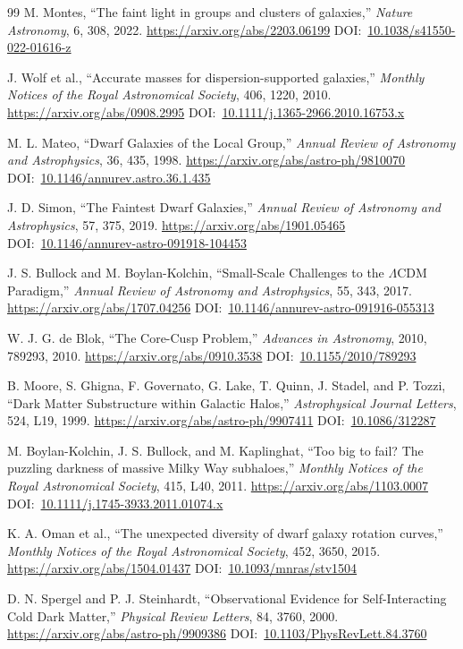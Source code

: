 \documentclass[10pt,onecolumn]{article}
\newcommand{\doi}[1]{DOI:~\href{https://doi.org/#1}{#1}}
\begin{document}
\begin{thebibliography}{99}
M. Montes,
``The faint light in groups and clusters of galaxies,''
\emph{Nature Astronomy}, 6, 308, 2022.
\url{https://arxiv.org/abs/2203.06199}
\doi{10.1038/s41550-022-01616-z}

J. Wolf et al.,
``Accurate masses for dispersion-supported galaxies,''
\emph{Monthly Notices of the Royal Astronomical Society}, 406, 1220, 2010.
\url{https://arxiv.org/abs/0908.2995}
\doi{10.1111/j.1365-2966.2010.16753.x}

M. L. Mateo,
``Dwarf Galaxies of the Local Group,''
\emph{Annual Review of Astronomy and Astrophysics}, 36, 435, 1998.
\url{https://arxiv.org/abs/astro-ph/9810070}
\doi{10.1146/annurev.astro.36.1.435}

J. D. Simon,
``The Faintest Dwarf Galaxies,''
\emph{Annual Review of Astronomy and Astrophysics}, 57, 375, 2019.
\url{https://arxiv.org/abs/1901.05465}
\doi{10.1146/annurev-astro-091918-104453}

J. S. Bullock and M. Boylan-Kolchin,
``Small-Scale Challenges to the $\Lambda$CDM Paradigm,''
\emph{Annual Review of Astronomy and Astrophysics}, 55, 343, 2017.
\url{https://arxiv.org/abs/1707.04256}
\doi{10.1146/annurev-astro-091916-055313}

W. J. G. de Blok,
``The Core-Cusp Problem,''
\emph{Advances in Astronomy}, 2010, 789293, 2010.
\url{https://arxiv.org/abs/0910.3538}
\doi{10.1155/2010/789293}

B. Moore, S. Ghigna, F. Governato, G. Lake, T. Quinn, J. Stadel, and P. Tozzi,
``Dark Matter Substructure within Galactic Halos,''
\emph{Astrophysical Journal Letters}, 524, L19, 1999.
\url{https://arxiv.org/abs/astro-ph/9907411}
\doi{10.1086/312287}

M. Boylan-Kolchin, J. S. Bullock, and M. Kaplinghat,
``Too big to fail? The puzzling darkness of massive Milky Way subhaloes,''
\emph{Monthly Notices of the Royal Astronomical Society}, 415, L40, 2011.
\url{https://arxiv.org/abs/1103.0007}
\doi{10.1111/j.1745-3933.2011.01074.x}

K. A. Oman et al.,
``The unexpected diversity of dwarf galaxy rotation curves,''
\emph{Monthly Notices of the Royal Astronomical Society}, 452, 3650, 2015.
\url{https://arxiv.org/abs/1504.01437}
\doi{10.1093/mnras/stv1504}

D. N. Spergel and P. J. Steinhardt,
``Observational Evidence for Self-Interacting Cold Dark Matter,''
\emph{Physical Review Letters}, 84, 3760, 2000.
\url{https://arxiv.org/abs/astro-ph/9909386}
\doi{10.1103/PhysRevLett.84.3760}


\end{thebibliography}
\end{document}
